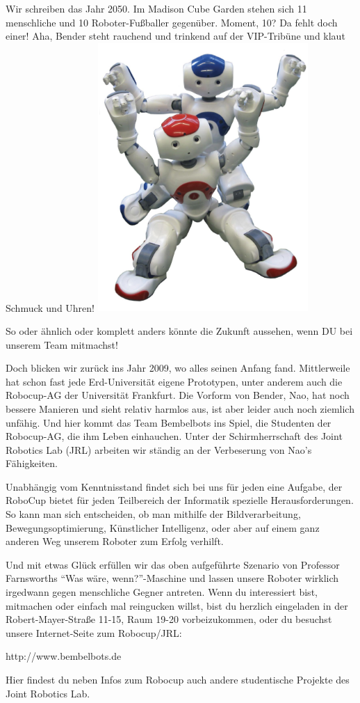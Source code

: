 Wir schreiben das Jahr 2050. Im Madison Cube Garden stehen sich 11 menschliche und 10 Roboter-Fußballer gegenüber. Moment, 10? Da fehlt doch einer! Aha, Bender steht rauchend und trinkend auf der VIP-Tribüne und klaut Schmuck und Uhren!
\includegraphics[width=8cm]{bitmaps/robocup1}

So oder ähnlich oder komplett anders könnte die Zukunft aussehen, wenn DU bei unserem Team mitmachst!

Doch blicken wir zurück ins Jahr 2009, wo alles seinen Anfang fand. Mittlerweile hat schon fast jede Erd-Universität eigene Prototypen, unter anderem auch die Robocup-AG der Universität Frankfurt. Die Vorform von Bender, Nao, hat noch bessere Manieren und sieht relativ harmlos aus, ist aber leider auch noch ziemlich unfähig. Und hier kommt das Team Bembelbots ins Spiel, die Studenten der Robocup-AG, die ihm Leben einhauchen. Unter der Schirmherrschaft des Joint Robotics Lab (JRL) arbeiten wir ständig an der Verbeserung von Nao's Fähigkeiten.

Unabhängig vom Kenntnisstand findet sich bei uns für jeden eine Aufgabe, der RoboCup bietet für jeden Teilbereich der Informatik spezielle Herausforderungen. So kann man sich entscheiden, ob man mithilfe der Bildverarbeitung, Bewegungsoptimierung, Künstlicher Intelligenz, oder aber auf einem ganz anderen Weg unserem Roboter zum Erfolg verhilft.

Und mit etwas Glück erfüllen wir das oben aufgeführte Szenario von Professor Farnsworths ``Was wäre, wenn?''-Maschine und lassen unsere Roboter wirklich irgedwann gegen menschliche Gegner antreten. Wenn du interessiert bist, mitmachen oder einfach mal reingucken willst, bist du herzlich eingeladen in der Robert-Mayer-Straße 11-15, Raum 19-20 vorbeizukommen, oder du besuchst unsere Internet-Seite zum Robocup/JRL:
 
http://www.bembelbots.de

Hier findest du neben Infos zum Robocup auch andere studentische Projekte des Joint Robotics Lab. 
